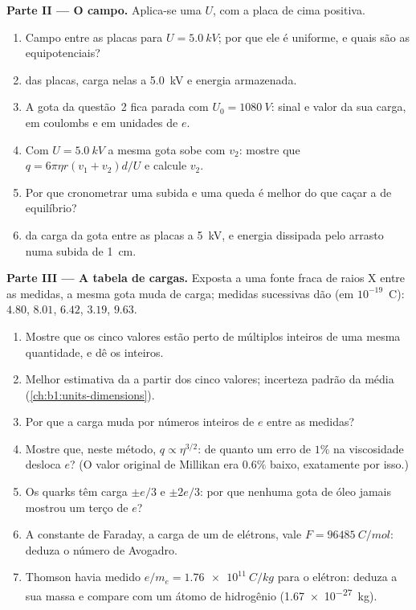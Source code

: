 \begin{problem}
\medskip
\noindent\textbf{Parte II --- O campo.}
Aplica-se uma  $U$, com a placa de cima positiva.
\begin{enumerate}[resume]
  \item Campo entre as placas para $U = \qty{5.0}{kV}$; por que ele é
        uniforme, e quais são as equipotenciais?
  \item {} das placas, carga nelas a \qty{5.0}{kV} e
        energia armazenada.
  \item A gota da questão~2 fica parada com $U_0 = \qty{1080}{V}$:
        sinal e valor da sua carga, em coulombs e em unidades de $e$.
  \item Com $U = \qty{5.0}{kV}$ a mesma gota sobe com $v_2$: mostre que
        $q = 6\pi\eta r(v_1 + v_2)d/U$ e calcule $v_2$.
  \item Por que cronometrar uma subida e uma queda é melhor do que caçar a
         de equilíbrio?
  \item {} da carga da gota entre as placas a
        \qty{5}{kV}, e energia dissipada pelo arrasto numa subida de
        \qty{1}{cm}.
\end{enumerate}

\medskip
\noindent\textbf{Parte III --- A tabela de cargas.}
Exposta a uma fonte fraca de raios X entre as medidas, a mesma gota
muda de carga; medidas sucessivas dão (em $10^{-19}$~C):
$4.80$, $8.01$, $6.42$, $3.19$, $9.63$.
\begin{enumerate}[resume]
  \item Mostre que os cinco valores estão perto de múltiplos inteiros de uma
        mesma quantidade, e dê os inteiros.
  \item Melhor estimativa da  a partir dos cinco valores;
        incerteza padrão da média (\cref{ch:b1:units-dimensions}).
  \item Por que a carga muda por números inteiros de $e$ entre as
        medidas?
  \item Mostre que, neste método, $q \propto \eta^{3/2}$: de quanto um erro
        de $1\%$ na viscosidade desloca $e$? (O valor original de Millikan era
        $0.6\%$ baixo, exatamente por isso.)
  \item Os quarks têm carga $\pm e/3$ e $\pm 2e/3$: por que nenhuma gota de óleo
        jamais mostrou um terço de $e$?
  \item A constante de Faraday, a carga de um  de elétrons, vale
        $F = \qty{96485}{C/mol}$: deduza o número de Avogadro.
  \item Thomson havia medido $e/m_e = \qty{1.76e11}{C/kg}$ para o
        elétron: deduza a sua massa e compare com um átomo de hidrogênio
        (\qty{1.67e-27}{kg}).
\end{enumerate}


\end{problem}
